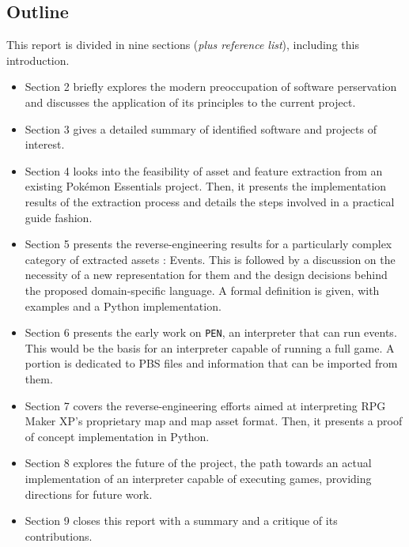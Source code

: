 \documentclass[11pt]{article}
\begin{document}
\newpage
\subsection{Outline}

This report is divided in nine sections (\textit{plus reference list}), including this introduction.

\begin{itemize}
	\item Section 2 briefly explores the modern preoccupation of software perservation and discusses the application of its principles to the current project.
	
	\item Section 3 gives a detailed summary of identified software and projects of interest.
	
	\item Section 4 looks into the feasibility of asset and feature extraction from an existing Pokémon Essentials project. Then, it presents the implementation results of the extraction process and details the steps involved in a practical guide fashion.
	
	\item Section 5 presents the reverse-engineering results for a particularly complex category of extracted assets : Events. This is followed by a discussion on the necessity of a new representation for them and the design decisions behind the proposed domain-specific language. A formal definition is given, with examples and a Python implementation.
	
	\item Section 6 presents the early work on \texttt{PEN}, an interpreter that can run events. This would be the basis for an interpreter capable of running a full game. A portion is dedicated to PBS files and information that can be imported from them.
	
	\item Section 7 covers the reverse-engineering efforts aimed at interpreting RPG Maker XP's proprietary map and map asset format. Then, it presents a proof of concept implementation in Python.
	
	\item Section 8 explores the future of the project, the path towards an actual implementation of an interpreter capable of executing games, providing directions for future work.
	
	\item Section 9 closes this report with a summary and a critique of its contributions.
\end{itemize}
\end{document}
